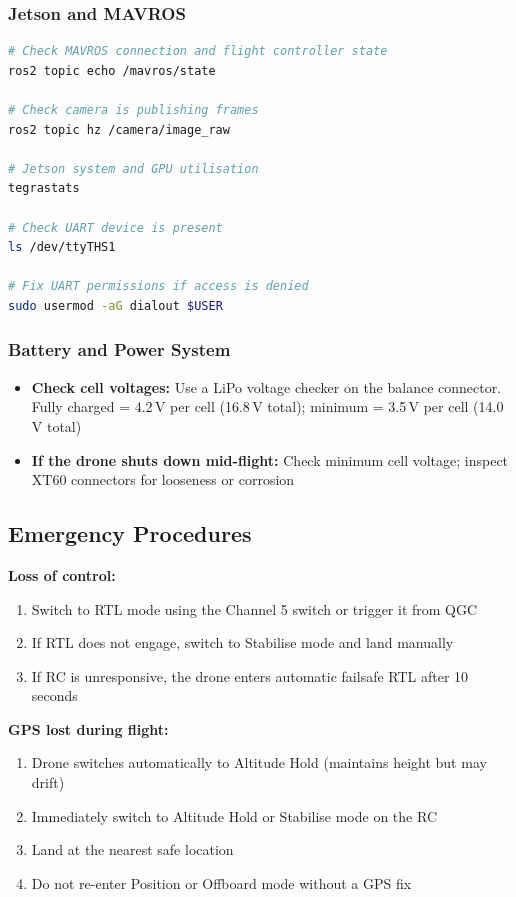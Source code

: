\documentclass{article}
\begin{document}
\subsubsection{Jetson and MAVROS}

\begin{lstlisting}[language=bash]
# Check MAVROS connection and flight controller state
ros2 topic echo /mavros/state

# Check camera is publishing frames
ros2 topic hz /camera/image_raw

# Jetson system and GPU utilisation
tegrastats

# Check UART device is present
ls /dev/ttyTHS1

# Fix UART permissions if access is denied
sudo usermod -aG dialout $USER
\end{lstlisting}

\subsubsection{Battery and Power System}

\begin{itemize}
    \item \textbf{Check cell voltages:} Use a LiPo voltage checker on the balance connector. Fully charged = 4.2\,V per cell (16.8\,V total); minimum = 3.5\,V per cell (14.0\,V total)
    \item \textbf{If the drone shuts down mid-flight:} Check minimum cell voltage; inspect XT60 connectors for looseness or corrosion
\end{itemize}

\subsection{Emergency Procedures}

\textbf{Loss of control:}
\begin{enumerate}
    \item Switch to RTL mode using the Channel 5 switch or trigger it from QGC
    \item If RTL does not engage, switch to Stabilise mode and land manually
    \item If RC is unresponsive, the drone enters automatic failsafe RTL after 10 seconds
\end{enumerate}

\textbf{GPS lost during flight:}
\begin{enumerate}
    \item Drone switches automatically to Altitude Hold (maintains height but may drift)
    \item Immediately switch to Altitude Hold or Stabilise mode on the RC
    \item Land at the nearest safe location
    \item Do not re-enter Position or Offboard mode without a GPS fix
\end{enumerate}
\end{document}
